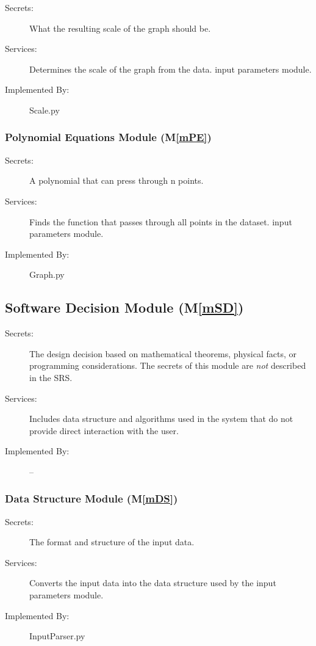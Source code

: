 \documentclass[12pt, titlepage]{article}
\newcommand{\mref}[1]{M\ref{#1}}
\begin{document}
\begin{description}
\item[Secrets:]What the resulting scale of the graph should be. 
\item[Services:]Determines the scale of the graph from the data.
  input parameters module.
\item[Implemented By:] Scale.py
\end{description}

\subsubsection{Polynomial Equations Module (\mref{mPE})}

\begin{description}
\item[Secrets:]A polynomial that can press through n points.  
\item[Services:]Finds the function that passes through all points in the dataset. 
  input parameters module.
\item[Implemented By:] Graph.py
\end{description}


\subsection{Software Decision Module  (\mref{mSD})}

\begin{description}
\item[Secrets:] The design decision based on mathematical theorems, physical
  facts, or programming considerations. The secrets of this module are
  \emph{not} described in the SRS.
\item[Services:] Includes data structure and algorithms used in the system that
  do not provide direct interaction with the user. 
\item[Implemented By:] --
\end{description}

\subsubsection{Data Structure Module (\mref{mDS})}
\begin{description}
\item[Secrets:]The format and structure of the input data.
\item[Services:]Converts the input data into the data structure used by the
  input parameters module.
\item[Implemented By:] InputParser.py
\end{description}
\end{document}
